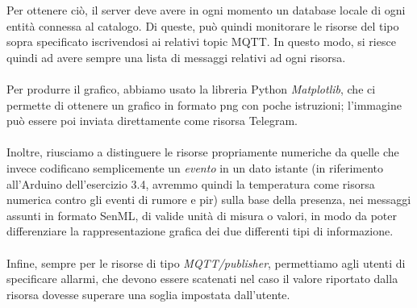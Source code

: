 \documentclass[12pt,a4paper]{article}
\begin{document}
Per ottenere ciò, il server deve avere in ogni momento un database locale di ogni entità connessa al catalogo. Di queste, può quindi monitorare le risorse del tipo sopra specificato iscrivendosi ai relativi topic MQTT. In questo modo, si riesce quindi ad avere sempre una lista di messaggi relativi ad ogni risorsa.
\\ \\
Per produrre il grafico, abbiamo usato la libreria Python \textit{Matplotlib}, che ci permette di ottenere un grafico in formato png con poche istruzioni; l'immagine può essere poi inviata direttamente come risorsa Telegram.
\\ \\
Inoltre, riusciamo a distinguere le risorse propriamente numeriche da quelle che invece codificano semplicemente un \textit{evento} in un dato istante (in riferimento all'Arduino dell'esercizio 3.4, avremmo quindi la temperatura come risorsa numerica contro gli eventi di rumore e pir) sulla base della presenza, nei messaggi assunti in formato SenML, di valide unità di misura o valori, in modo da poter differenziare la rappresentazione grafica dei due differenti tipi di informazione.
\\ \\
Infine, sempre per le risorse di tipo \textit{MQTT/publisher}, permettiamo agli utenti di specificare allarmi, che devono essere scatenati nel caso il valore riportato dalla risorsa dovesse superare una soglia impostata dall'utente.
\end{document}
